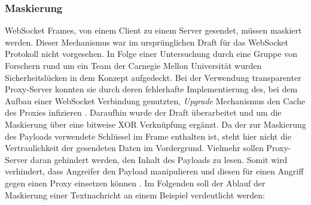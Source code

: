 \documentclass[11pt,a4paper,titlepage]{scrartcl}
\numberwithin{equation}{section}
\begin{document}
\subsubsection*{Maskierung}\label{subsubsec:wsMasking}
WebSocket Frames, von einem Client zu einem Server gesendet, müssen maskiert werden. Dieser Mechanismus war im ursprünglichen Draft für das WebSocket Protokoll nicht vorgesehen. In Folge einer Untersuchung durch eine Gruppe von Forschern rund um ein Team der Carnegie Mellon Universität wurden Sicherheitslücken in dem Konzept aufgedeckt. Bei der Verwendung transparenter Proxy-Server konnten sie durch deren fehlerhafte Implementierung des, bei dem Aufbau einer WebSocket Verbindung genutzten, \textit{Upgrade} Mechanismus den Cache des Proxies infizieren \autocite{huang_talking_2011}. Daraufhin wurde der Draft überarbeitet und um die Maskierung über eine bitweise XOR Verknüpfung ergänzt. Da der zur Maskierung des Payloads verwendete Schlüssel im Frame enthalten ist, steht hier nicht die Vertraulichkeit der gesendeten Daten im Vordergrund. Vielmehr sollen Proxy-Server daran gehindert werden, den Inhalt des Payloads zu lesen. Somit wird verhindert, dass Angreifer den Payload manipulieren und diesen für einen Angriff gegen einen Proxy einsetzen können \autocite{gorski_websockets_2015}.  Im Folgenden soll der Ablauf der Maskierung einer Textnachricht an einem Beispiel verdeutlicht werden:\\
\end{document}
